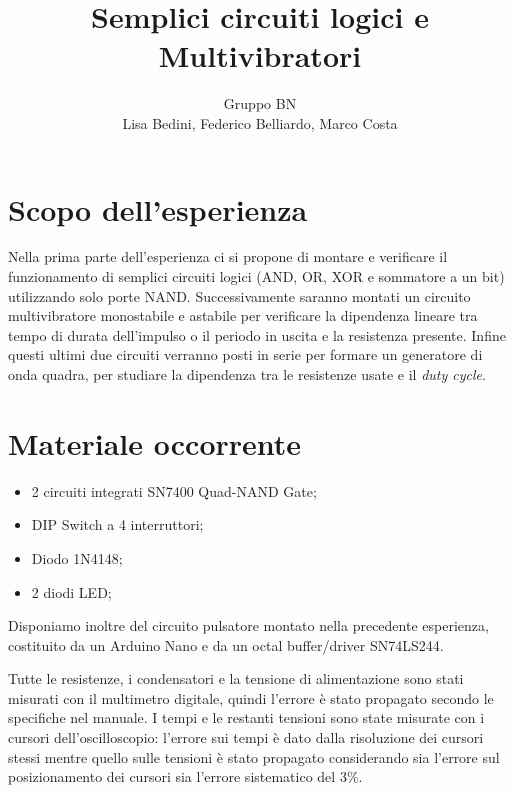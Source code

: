 \documentclass[10pt,a4paper]{article}
\author{Gruppo BN \\Lisa Bedini, Federico Belliardo, Marco Costa}
\title{Semplici circuiti logici e Multivibratori}
\begin{document}
\maketitle
\section{Scopo dell'esperienza}
Nella prima parte dell'esperienza ci si propone di montare e verificare il funzionamento di semplici circuiti logici (AND, OR, XOR e sommatore a un bit) utilizzando solo porte NAND. Successivamente saranno montati un circuito multivibratore monostabile e astabile per verificare la dipendenza lineare tra tempo di durata dell'impulso o il periodo in uscita e la resistenza presente. Infine questi ultimi due circuiti verranno posti in serie per formare un generatore di onda quadra, per studiare la dipendenza tra le resistenze usate e il \emph{duty cycle}.\\

\section{Materiale occorrente}
\begin{itemize}
\item 2 circuiti integrati SN7400 Quad-NAND Gate;
\item DIP Switch a 4 interruttori;
\item Diodo 1N4148;
\item 2 diodi LED;
\end{itemize}
Disponiamo inoltre del circuito pulsatore montato nella precedente esperienza, costituito da un Arduino Nano e da un octal buffer/driver SN74LS244.

Tutte le resistenze, i condensatori e la tensione di alimentazione sono stati misurati con il multimetro digitale, quindi l'errore è stato propagato secondo le specifiche nel manuale. I tempi e le restanti tensioni sono state misurate con i cursori dell'oscilloscopio: l'errore sui tempi è dato dalla risoluzione dei cursori stessi mentre quello sulle tensioni è stato propagato considerando sia l'errore sul posizionamento dei cursori sia l'errore sistematico del $3\%$.
\end{document}
